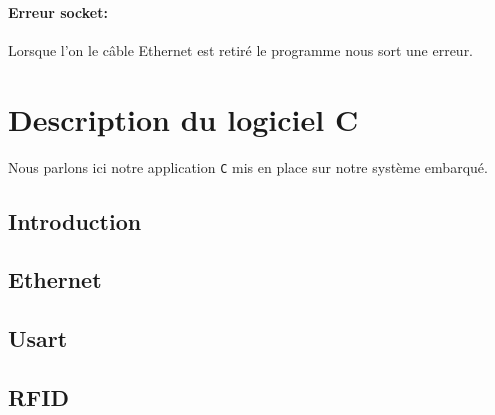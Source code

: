 \documentclass[12pt,a4paper]{report}
\begin{document}
			\paragraph{Erreur socket:} Lorsque l'on le câble Ethernet est retiré le programme nous sort une erreur.
	
	\section{Description du logiciel C}
	Nous parlons ici notre application \verb+C+ mis en place sur notre système embarqué.  
		\subsection{Introduction}
		\subsection{Ethernet}
		\subsection{Usart}
		\subsection{RFID}
	
			\begin{lstlisting}

			\end{lstlisting}
\end{document}
